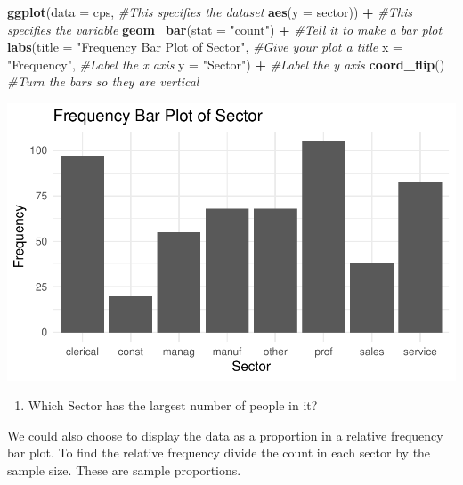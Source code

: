 \documentclass[
]{report}
\newenvironment{Shaded}{\begin{snugshade}}{\end{snugshade}}
\newcommand{\CommentTok}[1]{\textcolor[rgb]{0.56,0.35,0.01}{\textit{#1}}}
\newcommand{\DataTypeTok}[1]{\textcolor[rgb]{0.13,0.29,0.53}{#1}}
\newcommand{\KeywordTok}[1]{\textcolor[rgb]{0.13,0.29,0.53}{\textbf{#1}}}
\newcommand{\NormalTok}[1]{#1}
\newcommand{\OperatorTok}[1]{\textcolor[rgb]{0.81,0.36,0.00}{\textbf{#1}}}
\newcommand{\StringTok}[1]{\textcolor[rgb]{0.31,0.60,0.02}{#1}}
\providecommand{\tightlist}{%
  \setlength{\itemsep}{0pt}\setlength{\parskip}{0pt}}
\begin{document}
\begin{Shaded}
\begin{Highlighting}[]
\KeywordTok{ggplot}\NormalTok{(}\DataTypeTok{data =}\NormalTok{ cps,   }\CommentTok{\#This specifies the dataset}
       \KeywordTok{aes}\NormalTok{(}\DataTypeTok{y =}\NormalTok{ sector)) }\OperatorTok{+}\StringTok{   }\CommentTok{\#This specifies the variable}
\StringTok{  }\KeywordTok{geom\_bar}\NormalTok{(}\DataTypeTok{stat =} \StringTok{"count"}\NormalTok{) }\OperatorTok{+}\StringTok{  }\CommentTok{\#Tell it to make a bar plot}
\StringTok{  }\KeywordTok{labs}\NormalTok{(}\DataTypeTok{title =} \StringTok{"Frequency Bar Plot of Sector"}\NormalTok{,  }\CommentTok{\#Give your plot a title}
       \DataTypeTok{x =} \StringTok{"Frequency"}\NormalTok{,   }\CommentTok{\#Label the x axis}
       \DataTypeTok{y =} \StringTok{"Sector"}\NormalTok{)  }\OperatorTok{+}\StringTok{ }\CommentTok{\#Label the y axis}
\StringTok{  }\KeywordTok{coord\_flip}\NormalTok{()  }\CommentTok{\#Turn the bars so they are vertical}
\end{Highlighting}
\end{Shaded}

\begin{center}\includegraphics[width=0.5\linewidth]{03-EDA-categorical_files/figure-latex/unnamed-chunk-3-1} \end{center}

\begin{enumerate}
\def\labelenumi{\arabic{enumi}.}
\setcounter{enumi}{3}
\tightlist
\item
  Which Sector has the largest number of people in it?
\end{enumerate}

\vspace{0.3in}

We could also choose to display the data as a proportion in a relative frequency bar plot. To find the relative frequency divide the count in each sector by the sample size. These are sample proportions.
\end{document}
